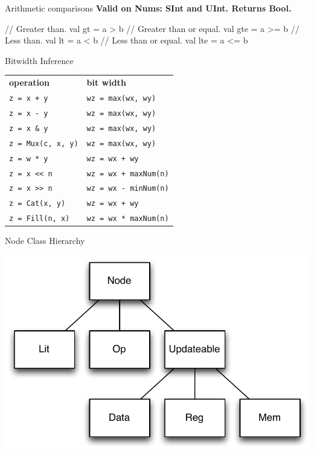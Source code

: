 \documentclass[xcolor=pdflatex,dvipsnames,table]{beamer}
\begin{document}
\begin{frame}[fragile]{Arithmetic comparisons}
\textbf{Valid on Nums: SInt and UInt. Returns Bool.}
\begin{scala}
// Greater than.
val gt  = a > b   
// Greater than or equal.
val gte = a >= b  
// Less than.
val lt  = a < b   
// Less than or equal.
val lte = a <= b  
\end{scala}
\end{frame}

\begin{frame}[fragile]{Bitwidth Inference}
\begin{center}
\begin{tabular}{ll}
{\bf operation} & {\bf bit width} \\ 
\verb|z = x + y| & \verb+wz = max(wx, wy)+ \\
\verb+z = x - y+ & \verb+wz = max(wx, wy)+\\
\verb+z = x & y+ & \verb+wz = max(wx, wy)+ \\
\verb+z = Mux(c, x, y)+ & \verb+wz = max(wx, wy)+ \\
\verb+z = w * y+ & \verb!wz = wx + wy! \\
\verb+z = x << n+ & \verb!wz = wx + maxNum(n)! \\
\verb+z = x >> n+ & \verb+wz = wx - minNum(n)+ \\
\verb+z = Cat(x, y)+ & \verb!wz = wx + wy! \\
\verb+z = Fill(n, x)+ & \verb+wz = wx * maxNum(n)+ \\
\end{tabular}
\end{center}
\end{frame}

\begin{frame}[fragile]{Node Class Hierarchy}

\begin{center}
\includegraphics[height=0.9\textheight]{../manual/figs/node-hierarchy.pdf}
\end{center}

\end{frame}
\end{document}
